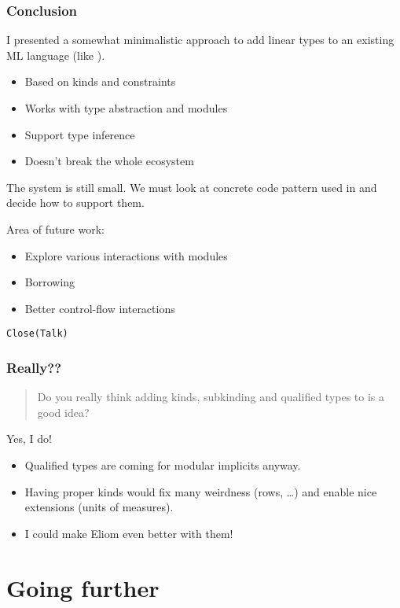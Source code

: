 \documentclass[xcolor=svgnames,11pt]{beamer}
\begin{document}
\begin{frame}
  \frametitle{Conclusion}

  I presented a somewhat minimalistic approach to add linear types to an existing ML language (like \ocaml).

  \begin{itemize}
  \item Based on kinds and constraints
  \item Works with type abstraction and modules
  \item Support type inference
  \item Doesn't break the whole ecosystem
  \end{itemize}

  The system is still small. We must look at concrete code pattern used in \ocaml and decide how to support them.

  Area of future work:
  \begin{itemize}
  \item Explore various interactions with modules
  \item Borrowing
  \item Better control-flow interactions
  \end{itemize}
\end{frame}

\begin{frame}
  \Huge{\texttt{Close(Talk)}}
\end{frame}

\begin{frame}
  \frametitle{Really??}

  \begin{quote}
    Do you really think adding kinds, subkinding and qualified types to \ocaml is a good idea?
  \end{quote}\pause
  Yes, I do!\pause
  \begin{itemize}
  \item Qualified types are coming for modular implicits anyway.
  \item Having proper kinds would fix many weirdness (rows, \dots) and
    enable nice extensions (units of measures).\pause
  \item I could make Eliom even better with them! \smiley{}
  \end{itemize}
\end{frame}


\section{Going further}
\end{document}
